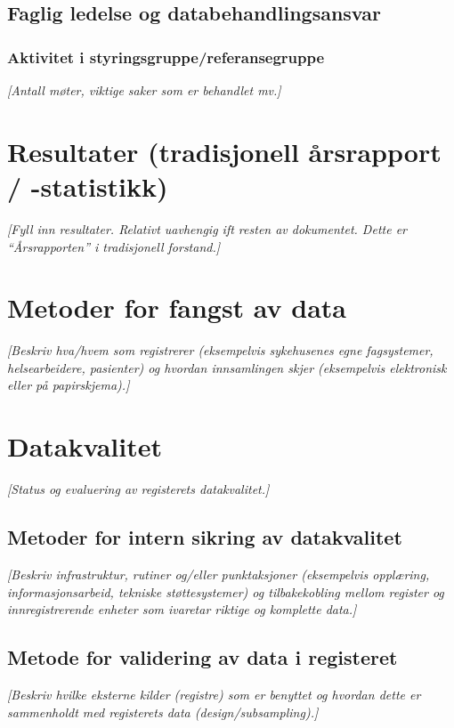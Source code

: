 \documentclass[norsk, a4paper, twocolumn]{report}
\newcommand{\guide}[1] {
	\textit{[\textcolor{guidegray}{#1}]}
	}
\begin{document}
\section{Faglig ledelse og databehandlingsansvar}\label{cha:led}

\subsection{Aktivitet i styringsgruppe/referansegruppe}
\guide{Antall møter, viktige saker som er behandlet mv.}



\chapter{Resultater (tradisjonell årsrapport / -statistikk)}\label{cha:res}
\guide{Fyll inn resultater. Relativt uavhengig ift resten av dokumentet. Dette er ``Årsrapporten'' i tradisjonell forstand.}






\chapter{Metoder for fangst av data}\label{cha:metoder}
\guide{Beskriv hva/hvem som registrerer (eksempelvis sykehusenes egne
fagsystemer, helsearbeidere, pasienter) og hvordan innsamlingen skjer
(eksempelvis elektronisk eller på papirskjema).}




\chapter{Datakvalitet}\label{cha:kva}
\guide{Status og evaluering av registerets  datakvalitet.}

\section{Metoder for intern sikring av datakvalitet}\label{sec:sik}
\guide{Beskriv infrastruktur, rutiner og/eller punktaksjoner (eksempelvis
opplæring, informasjonsarbeid, tekniske støttesystemer) og tilbakekobling mellom register og innregistrerende enheter som ivaretar riktige og
komplette data.}

\section{Metode for validering av data i registeret}\label{sec:metval}
\guide{Beskriv hvilke eksterne kilder (registre) som er benyttet og hvordan
dette er sammenholdt med registerets data (design/subsampling).} 
\end{document}
